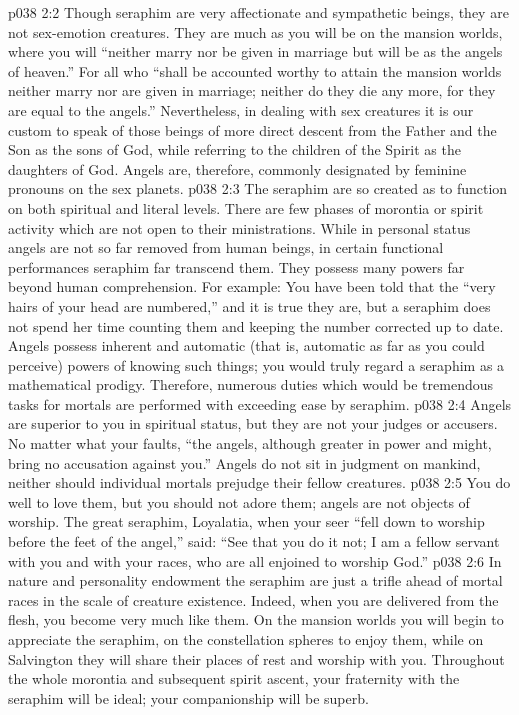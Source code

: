 \pc \vs p038 2:2 Though seraphim are very affectionate and sympathetic beings, they are not sex\hyp{}emotion creatures. They are much as you will be on the mansion worlds, where you will “neither marry nor be given in marriage but will be as the angels of heaven.” For all who “shall be accounted worthy to attain the mansion worlds neither marry nor are given in marriage; neither do they die any more, for they are equal to the angels.” Nevertheless, in dealing with sex creatures it is our custom to speak of those beings of more direct descent from the Father and the Son as the sons of God, while referring to the children of the Spirit as the daughters of God. Angels are, therefore, commonly designated by feminine pronouns on the sex planets.
\vs p038 2:3 The seraphim are so created as to function on both spiritual and literal levels. There are few phases of morontia or spirit activity which are not open to their ministrations. While in personal status angels are not so far removed from human beings, in certain functional performances seraphim far transcend them. They possess many powers far beyond human comprehension. For example: You have been told that the “very hairs of your head are numbered,” and it is true they are, but a seraphim does not spend her time counting them and keeping the number corrected up to date. Angels possess inherent and automatic (that is, automatic as far as you could perceive) powers of knowing such things; you would truly regard a seraphim as a mathematical prodigy. Therefore, numerous duties which would be tremendous tasks for mortals are performed with exceeding ease by seraphim.
\pc \vs p038 2:4 Angels are superior to you in spiritual status, but they are not your judges or accusers. No matter what your faults, “the angels, although greater in power and might, bring no accusation against you.” Angels do not sit in judgment on mankind, neither should individual mortals prejudge their fellow creatures.
\pc \vs p038 2:5 You do well to love them, but you should not adore them; angels are not objects of worship. The great seraphim, Loyalatia, when your seer “fell down to worship before the feet of the angel,” said: “See that you do it not; I am a fellow servant with you and with your races, who are all enjoined to worship God.”
\vs p038 2:6 In nature and personality endowment the seraphim are just a trifle ahead of mortal races in the scale of creature existence. Indeed, when you are delivered from the flesh, you become very much like them. On the mansion worlds you will begin to appreciate the seraphim, on the constellation spheres to enjoy them, while on Salvington they will share their places of rest and worship with you. Throughout the whole morontia and subsequent spirit ascent, your fraternity with the seraphim will be ideal; your companionship will be superb.
